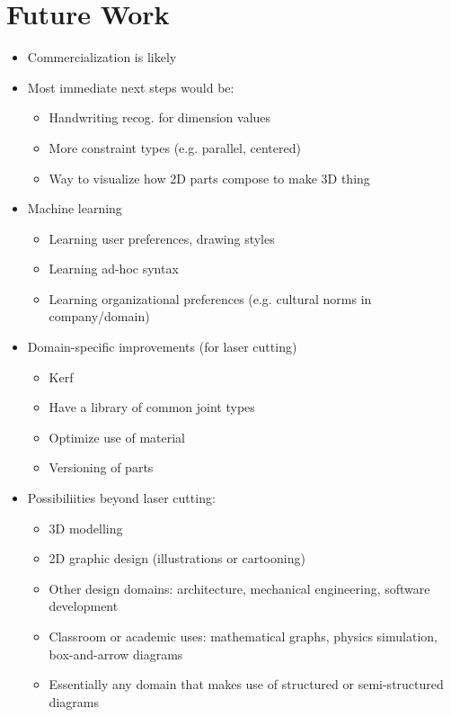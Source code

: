 \section{Future Work}

\begin{itemize}
\item Commercialization is likely
\item Most immediate next steps would be:
  \begin{itemize}
  \item Handwriting recog. for dimension values
  \item More constraint types (e.g. parallel, centered)
  \item Way to visualize how 2D parts compose to make 3D thing
  \end{itemize}
\item Machine learning
  \begin{itemize}
    \item Learning user preferences, drawing styles
    \item Learning ad-hoc syntax
    \item Learning organizational preferences (e.g. cultural norms in
      company/domain)
  \end{itemize}
\item Domain-specific improvements (for laser cutting)
  \begin{itemize}
  \item Kerf
  \item Have a library of common joint types
  \item Optimize use of material
  \item Versioning of parts
  \end{itemize}
\item Possibiliities beyond laser cutting:
  \begin{itemize}
  \item 3D modelling
  \item 2D graphic design (illustrations or cartooning)
  \item Other design domains: architecture, mechanical engineering,
    software development
  \item Classroom or academic uses: mathematical graphs, physics
    simulation, box-and-arrow diagrams
  \item Essentially any domain that makes use of structured or
    semi-structured diagrams
  \end{itemize}
\end{itemize}
